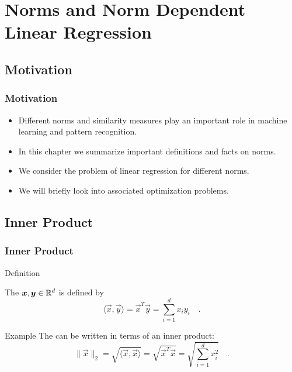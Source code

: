 
\section{Norms and Norm Dependent Linear Regression}

\subsection{Motivation}

\begin{frame}
  \frametitle{Motivation}

  \begin{itemize}
    \item Different norms and similarity measures play an important role in machine learning and pattern recognition. \\[.5cm]
    \item In this chapter we summarize important definitions and facts on norms. \\[.5cm]
    \item We consider the problem of linear regression for different norms. \\[.5cm]
    \item We will briefly look into associated optimization problems.
  \end{itemize}
\end{frame}


\subsection{Inner Product}

\begin{frame}
  \frametitle{Inner Product}

  \begin{citeblock}{Definition}

    The  ${\bm x}, {\bm y}\in \mathbb{R}^d$ is defined by 
    \begin{displaymath}
      \langle\vec x, \vec y\rangle = \vec x^T \vec y = \sum_{i=1}^d x_iy_i \quad .
    \end{displaymath}
  \end{citeblock}
  \pspread
  
  \begin{ovalblock}{Example}
    The  can be written in terms of an inner product:
    \begin{displaymath}
      \| \vec x \|_2 = \sqrt{\langle \vec x, \vec x \rangle } = 
      \sqrt{ \vec x^T \vec x} = 
      \sqrt{\sum_{i=1}^d x_i^2 }\quad .
    \end{displaymath}
  \end{ovalblock}
\end{frame}


